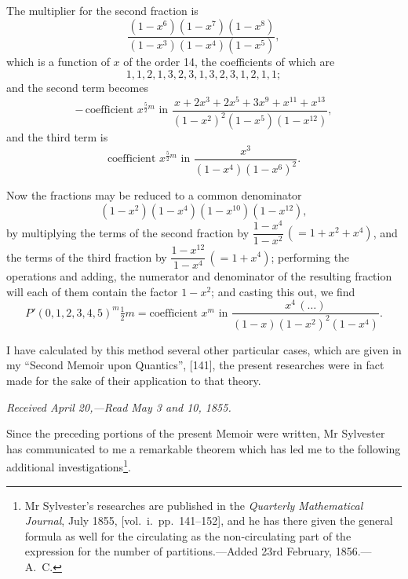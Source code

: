 \documentclass[11pt]{article}
\begin{document}
The multiplier for the second fraction is
\[
\frac{(1 - x^6)(1 - x^7)(1 - x^8)}{(1 - x^3)(1 - x^4)(1 - x^5)},
\]
which is a function of $x$ of the order 14, the coefficients of which are
\[
1, 1, 2, 1, 3, 2, 3, 1, 3, 2, 3, 1, 2, 1, 1;
\]
and the second term becomes
\[
-\,\text{coefficient } x^{\frac{5}{2}m} \text{ in } \frac{x + 2 x^3 + 2 x^5 + 3 x^9 + x^{11} + x^{13}}{(1 - x^2)^2(1 - x^5)(1 - x^{12})},
\]
and the third term is
\[
\text{coefficient } x^{\frac{5}{2}m} \text{ in } \frac{x^3}{(1 - x^4)(1 - x^6)^2}.
\]

Now the fractions may be reduced to a common denominator
\[
(1 - x^2)(1 - x^4)(1 - x^{10})(1 - x^{12}),
\]
by multiplying the terms of the second fraction by $\dfrac{1 - x^4}{1 - x^2}\,(= 1 + x^2 + x^4)$, and the terms of the third fraction by $\dfrac{1 - x^{12}}{1 - x^4}\,(= 1 + x^4)$; performing the operations and adding, the numerator and denominator of the resulting fraction will each of them contain the factor $1 - x^2$; and casting this out, we find
\[
P'(0, 1, 2, 3, 4, 5)^m \tfrac{1}{2}m = \text{coefficient } x^m \text{ in } \frac{x^4 \,(\ldots)}{(1 - x)(1 - x^2)^2(1 - x^4)}.
\]

I have calculated by this method several other particular cases, which are given in my ``Second Memoir upon Quantics'', [141], the present researches were in fact made for the sake of their application to that theory.

\bigskip
\noindent\textit{Received April 20,---Read May 3 and 10, 1855.}

\medskip

\noindent Since the preceding portions of the present Memoir were written, Mr Sylvester has communicated to me a remarkable theorem which has led me to the following additional investigations\footnote{Mr Sylvester's researches are published in the \textit{Quarterly Mathematical Journal}, July 1855, [vol.~i.\ pp.\ 141--152], and he has there given the general formula as well for the circulating as the non-circulating part of the expression for the number of partitions.---Added 23rd February, 1856.---A.~C.}.
\end{document}
